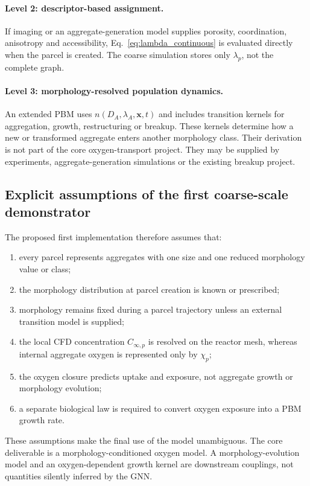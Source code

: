 \documentclass[11pt,a4paper]{article}
\begin{document}
\paragraph{Level 2: descriptor-based assignment.}
If imaging or an aggregate-generation model supplies porosity, coordination,
anisotropy and accessibility, Eq.~\eqref{eq:lambda_continuous} is evaluated
directly when the parcel is created. The coarse simulation stores only
\(\lambda_p\), not the complete graph.

\paragraph{Level 3: morphology-resolved population dynamics.}
An extended PBM uses \(n(D_A,\lambda_A,\boldsymbol{x},t)\) and includes
transition kernels for aggregation, growth, restructuring or breakup. These
kernels determine how a new or transformed aggregate enters another
morphology class. Their derivation is not part of the core oxygen-transport
project. They may be supplied by experiments, aggregate-generation
simulations or the existing breakup project.

\subsection{Explicit assumptions of the first coarse-scale demonstrator}

The proposed first implementation therefore assumes that:
\begin{enumerate}
  \item every parcel represents aggregates with one size and one reduced
  morphology value or class;
  \item the morphology distribution at parcel creation is known or prescribed;
  \item morphology remains fixed during a parcel trajectory unless an external
  transition model is supplied;
  \item the local CFD concentration \(C_{\infty,p}\) is resolved on the reactor
  mesh, whereas internal aggregate oxygen is represented only by \(\chi_p\);
  \item the oxygen closure predicts uptake and exposure, not aggregate growth
  or morphology evolution;
  \item a separate biological law is required to convert oxygen exposure into
  a PBM growth rate.
\end{enumerate}

These assumptions make the final use of the model unambiguous. The core
deliverable is a morphology-conditioned oxygen model. A morphology-evolution
model and an oxygen-dependent growth kernel are downstream couplings, not
quantities silently inferred by the GNN.
\end{document}
